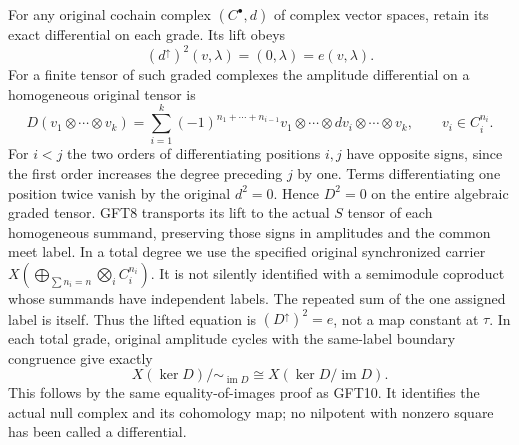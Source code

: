 For any original cochain complex $(C^\bullet,d)$ of complex vector
spaces, retain its exact differential on each grade. Its lift obeys
\begin{equation}\tag{GFT13}
 (d^\uparrow)^2(v,\lambda)=(0,\lambda)=e(v,\lambda).
\end{equation}
For a finite tensor of such graded complexes the amplitude
differential on a homogeneous original tensor is
\begin{equation}\tag{GFT14}
 D(v_1\otimes\cdots\otimes v_k)
  =\sum_{i=1}^k(-1)^{n_1+\cdots+n_{i-1}}
       v_1\otimes\cdots\otimes d v_i\otimes\cdots\otimes v_k,
 \qquad v_i\in C_i^{n_i}.
\end{equation}
For $i<j$ the two orders of differentiating positions $i,j$
have opposite signs, since the first order increases the degree
preceding $j$ by one. Terms differentiating one position twice
vanish by the original $d^2=0$. Hence $D^2=0$ on the entire
algebraic graded tensor. GFT8 transports its lift to the actual
$S$ tensor of each homogeneous summand, preserving those signs
in amplitudes and the common meet label. In a total degree we use
the specified original synchronized carrier
$X(\bigoplus_{\sum n_i=n}\bigotimes_i C_i^{n_i})$.
It is not silently identified with a semimodule coproduct whose
summands have independent labels. The repeated sum of the one
assigned label is itself. Thus the
lifted equation is $(D^\uparrow)^2=e$, not a map constant at
$\tau$. In each total grade, original amplitude cycles with
the same-label boundary congruence give exactly
\begin{equation}\tag{GFT15}
 X(\ker D)/\!\sim_{\operatorname{im}D}
                         \cong X(\ker D/\operatorname{im}D).
\end{equation}
This follows by the same equality-of-images proof as GFT10.
It identifies the actual null complex and its cohomology map;
no nilpotent with nonzero square has been called a differential.


